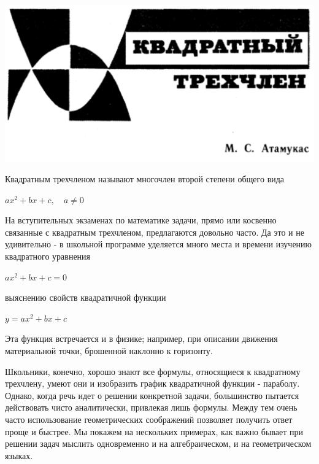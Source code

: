\documentclass[main.tex]{subfiles}
\begin{document}

\begin{center}
\includegraphics[width=1\textwidth]{picture}
\end{center}


Квадратным трехчленом называют многочлен второй степени общего вида

\begin{center}
$ax^{2} + bx + c, \quad a \ne 0$
\end{center}

На вступительных экзаменах по математике задачи, прямо или косвенно связанные с квадратным трехчленом, предлагаются довольно часто. Да это и не удивительно - в школьной программе уделяется много места и времени изучению квадратного уравнения

\begin{center}
$ax^{2} + bx + c = 0$
\end{center}

\noindent выяснению свойств квадратичной функции

\begin{center}
$y = ax^{2} + bx + c$
\end{center}

\noindent Эта функция встречается и в физике; например, при описании движения материальной точки, брошенной наклонно к горизонту.

Школьники, конечно, хорошо знают все формулы, относящиеся к квадратному трехчлену, умеют они и изобразить график квадратичной функции - параболу. Однако, когда речь идет о решении конкретной задачи, большинство пытается действовать чисто аналитически, привлекая лишь формулы. Между тем очень часто использование геометрических соображений позволяет получить ответ проще и быстрее. Мы покажем на нескольких примерах, как важно бывает при решении задач мыслить одновременно и на алгебраическом, и на геометрическом языках.
\end{document}

